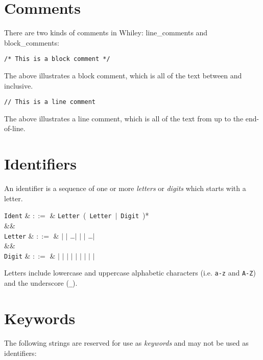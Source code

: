 \pagebreak
\section{Comments}
There are two kinds of comments in Whiley: \gls{line_comment}s and \gls{block_comment}s:
\begin{lstlisting}
/* This is a block comment */
\end{lstlisting}
The above illustrates a block comment, which is all of the text between \token{/*} and \token{*/} inclusive.
\begin{lstlisting}
// This is a line comment
\end{lstlisting}
The above illustrates a line comment, which is all of the text from \token{//} up to the end-of-line.

\section{Identifiers}
An identifier is a sequence of one or more {\em letters} or {\em digits} which starts with a letter.
\begin{syntax}
\verb+Ident+ & $::=$ & \verb+Letter+\ \big(\ \verb+Letter+\ $|$\ \verb+Digit+\ \big)*\\
&&\\
\verb+Letter+ & $::=$ & \token{\_} $|$  $|$ \ldots $|$  $|$  $|$ \ldots $|$ \\
&&\\
\verb+Digit+ & $::=$ &  $|$  $|$  $|$  $|$  $|$  $|$  $|$  $|$  $|$ \\
\end{syntax}

Letters include lowercase and uppercase alphabetic characters (i.e. \lstinline+a-z+ and \lstinline+A-Z+) and the underscore (\lstinline+_+).

\section{Keywords}
The following strings are reserved for use as {\em keywords} and may not be used as identifiers:

